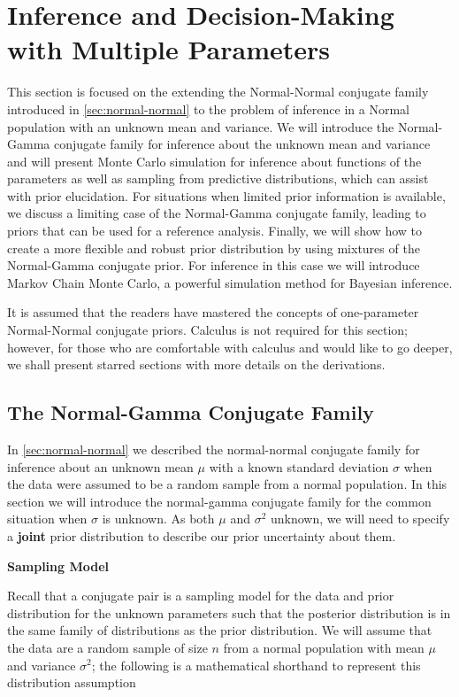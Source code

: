 \documentclass[]{book}
\theoremstyle{definition}
\theoremstyle{definition}
\theoremstyle{definition}
\theoremstyle{remark}
\begin{document}
\section{Inference and Decision-Making with Multiple
Parameters}\label{inference-and-decision-making-with-multiple-parameters}

This section is focused on the extending the Normal-Normal conjugate
family introduced in \ref{sec:normal-normal} to the problem of inference
in a Normal population with an unknown mean and variance. We will
introduce the Normal-Gamma conjugate family for inference about the
unknown mean and variance and will present Monte Carlo simulation for
inference about functions of the parameters as well as sampling from
predictive distributions, which can assist with prior elucidation. For
situations when limited prior information is available, we discuss a
limiting case of the Normal-Gamma conjugate family, leading to priors
that can be used for a reference analysis. Finally, we will show how to
create a more flexible and robust prior distribution by using mixtures
of the Normal-Gamma conjugate prior. For inference in this case we will
introduce Markov Chain Monte Carlo, a powerful simulation method for
Bayesian inference.

It is assumed that the readers have mastered the concepts of
one-parameter Normal-Normal conjugate priors. Calculus is not required
for this section; however, for those who are comfortable with calculus
and would like to go deeper, we shall present starred sections with more
details on the derivations.

\subsection{The Normal-Gamma Conjugate Family}\label{sec:normal-gamma}

In \ref{sec:normal-normal} we described the normal-normal conjugate
family for inference about an unknown mean \(\mu\) with a known standard
deviation \(\sigma\) when the data were assumed to be a random sample
from a normal population. In this section we will introduce the
normal-gamma conjugate family for the common situation when \(\sigma\)
is unknown. As both \(\mu\) and \(\sigma^2\) unknown, we will need to
specify a \textbf{joint} prior distribution to describe our prior
uncertainty about them.

\textbf{Sampling Model}

Recall that a conjugate pair is a sampling model for the data and prior
distribution for the unknown parameters such that the posterior
distribution is in the same family of distributions as the prior
distribution. We will assume that the data are a random sample of size
\(n\) from a normal population with mean \(\mu\) and variance
\(\sigma^2\); the following is a mathematical shorthand to represent
this distribution assumption
\end{document}
